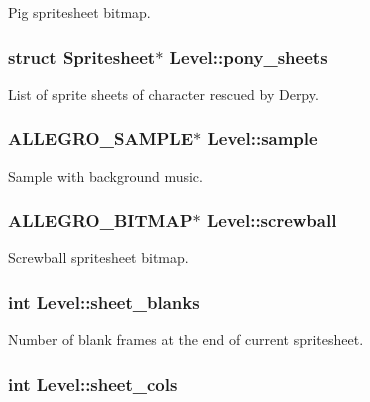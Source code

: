\-Pig spritesheet bitmap. \hypertarget{structLevel_a591b830752cc796a306e96166f736e3b}{
\subsubsection[{pony\-\_\-sheets}]{\setlength{\rightskip}{0pt plus 5cm}struct {\bf \-Spritesheet}$\ast$ {\bf \-Level\-::pony\-\_\-sheets}}}\label{structLevel_a591b830752cc796a306e96166f736e3b}
\-List of sprite sheets of character rescued by \-Derpy. \hypertarget{structLevel_a234fa7b9ec35dd360e4e3c48a944fc7d}{
\subsubsection[{sample}]{\setlength{\rightskip}{0pt plus 5cm}\-A\-L\-L\-E\-G\-R\-O\-\_\-\-S\-A\-M\-P\-L\-E$\ast$ {\bf \-Level\-::sample}}}\label{structLevel_a234fa7b9ec35dd360e4e3c48a944fc7d}
\-Sample with background music. \hypertarget{structLevel_a40c90c0712efb86cd76d0dcae74f2cbd}{
\subsubsection[{screwball}]{\setlength{\rightskip}{0pt plus 5cm}\-A\-L\-L\-E\-G\-R\-O\-\_\-\-B\-I\-T\-M\-A\-P$\ast$ {\bf \-Level\-::screwball}}}\label{structLevel_a40c90c0712efb86cd76d0dcae74f2cbd}
\-Screwball spritesheet bitmap. \hypertarget{structLevel_aebaaba311e5d4842fdbd8c50edd40808}{
\subsubsection[{sheet\-\_\-blanks}]{\setlength{\rightskip}{0pt plus 5cm}int {\bf \-Level\-::sheet\-\_\-blanks}}}\label{structLevel_aebaaba311e5d4842fdbd8c50edd40808}
\-Number of blank frames at the end of current spritesheet. \hypertarget{structLevel_a8a5c443169a4ff15f330a65473eedb1b}{
\subsubsection[{sheet\-\_\-cols}]{\setlength{\rightskip}{0pt plus 5cm}int {\bf \-Level\-::sheet\-\_\-cols}}}\label{structLevel_a8a5c443169a4ff15f330a65473eedb1b}

